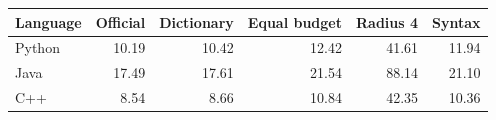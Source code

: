 \begin{tabular}{@{}lrrrrr@{}}
\toprule
Language & Official & Dictionary & Equal budget & Radius 4 & Syntax \\
\midrule
Python & 10.19 & 10.42 & 12.42 & 41.61 & 11.94 \\
Java & 17.49 & 17.61 & 21.54 & 88.14 & 21.10 \\
C++ & 8.54 & 8.66 & 10.84 & 42.35 & 10.36 \\
\bottomrule
\end{tabular}
